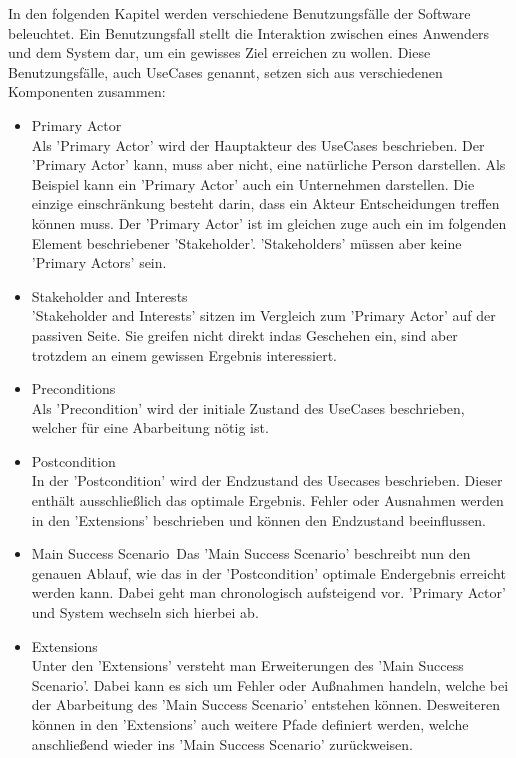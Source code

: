 \documentclass[../../Pflichtenheft.tex]{subfiles}
\begin{document}
In den folgenden Kapitel werden verschiedene Benutzungsfälle der Software beleuchtet.
Ein Benutzungsfall stellt die Interaktion zwischen eines Anwenders und dem System dar, um ein gewisses Ziel erreichen zu wollen.
Diese Benutzungsfälle, auch UseCases genannt, setzen sich aus verschiedenen Komponenten zusammen:
    \begin{itemize}
        \item Primary Actor\\
            Als 'Primary Actor' wird der Hauptakteur des UseCases beschrieben.
            Der 'Primary Actor' kann, muss aber nicht, eine natürliche Person darstellen. Als Beispiel kann ein 'Primary Actor' auch
            ein Unternehmen darstellen. Die einzige einschränkung besteht darin, dass ein Akteur Entscheidungen treffen können muss.
            Der 'Primary Actor' ist im gleichen zuge auch ein im folgenden Element beschriebener 'Stakeholder'. 'Stakeholders' müssen
            aber keine 'Primary Actors' sein.
        \item Stakeholder and Interests\\
            'Stakeholder and Interests' sitzen im Vergleich zum 'Primary Actor' auf der passiven Seite. Sie greifen nicht direkt
            indas Geschehen ein, sind aber trotzdem an einem gewissen Ergebnis interessiert.
        \item Preconditions\\
            Als 'Precondition' wird der initiale Zustand des UseCases beschrieben, welcher für eine Abarbeitung nötig ist.
        \item Postcondition\\
            In der 'Postcondition' wird der Endzustand des Usecases beschrieben. Dieser enthält ausschließlich das optimale Ergebnis.
            Fehler oder Ausnahmen werden in den 'Extensions' beschrieben und können den Endzustand beeinflussen.
        \item Main Success Scenario\
            Das 'Main Success Scenario' beschreibt nun den genauen Ablauf, wie das in der 'Postcondition' optimale Endergebnis erreicht werden kann.
            Dabei geht man chronologisch aufsteigend vor. 'Primary Actor' und System wechseln sich hierbei ab.
        \item Extensions\\
            Unter den 'Extensions' versteht man Erweiterungen des 'Main Success Scenario'. Dabei kann es sich um Fehler oder Außnahmen handeln,
            welche bei der Abarbeitung des 'Main Success Scenario' entstehen können. Desweiteren können in den 'Extensions' auch
            weitere Pfade definiert werden, welche anschließend wieder ins 'Main Success Scenario'  zurückweisen.
    \end{itemize}
\end{document}
